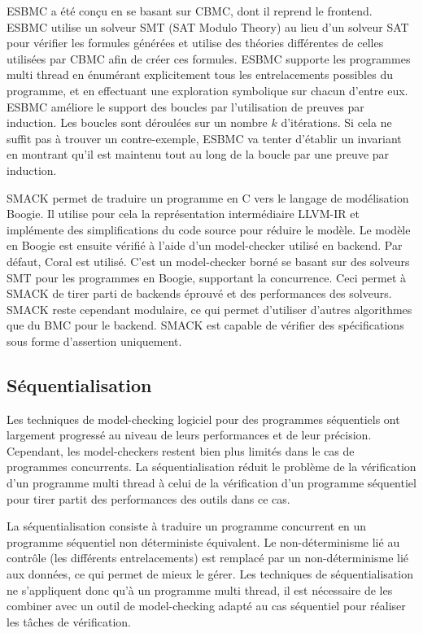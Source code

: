 ESBMC\cite{ESBMC} a été conçu en se basant sur CBMC, dont il reprend le
frontend. ESBMC utilise un solveur SMT (SAT Modulo Theory) au lieu d'un solveur
SAT pour vérifier les formules générées et utilise des théories différentes de
celles utilisées par CBMC afin de créer ces formules. ESBMC supporte les
programmes multi thread en énumérant explicitement tous les entrelacements
possibles du programme, et en effectuant une exploration symbolique sur chacun
d'entre eux. ESBMC améliore le support des boucles par l'utilisation de preuves
par induction\cite{ESBMC_k_induction}. Les boucles sont déroulées sur un nombre
\(k\) d'itérations. Si cela ne suffit pas à trouver un contre-exemple, ESBMC va
tenter d'établir un invariant en montrant qu'il est maintenu tout au long de la
boucle par une preuve par induction.

SMACK\cite{SMACK} permet de traduire un programme en C vers le langage de
modélisation Boogie. Il utilise pour cela la représentation
intermédiaire LLVM-IR et implémente des simplifications du code source pour
réduire le modèle. Le modèle en Boogie est ensuite vérifié à l'aide d'un
model-checker utilisé en backend. Par défaut, Coral est utilisé. C'est un
model-checker borné se basant sur des solveurs SMT pour les programmes en
Boogie, supportant la concurrence. Ceci permet à SMACK de tirer parti de
backends éprouvé et des performances des solveurs. SMACK reste cependant
modulaire, ce qui permet d'utiliser d'autres algorithmes que du BMC pour le
backend. SMACK est capable de vérifier des spécifications sous forme d'assertion
uniquement.

\subsection{Séquentialisation}

Les techniques de model-checking logiciel pour des programmes séquentiels ont
largement progressé au niveau de leurs performances et de leur précision.
Cependant, les model-checkers restent bien plus limités dans le cas de
programmes concurrents. La séquentialisation réduit le problème de la
vérification d'un programme multi thread à celui de la vérification d'un
programme séquentiel pour tirer partit des performances des outils dans ce cas.

La séquentialisation consiste à traduire un programme concurrent en un programme
séquentiel non déterministe équivalent. Le non-déterminisme lié au contrôle (les
différents entrelacements) est remplacé par un non-déterminisme lié aux données,
ce qui permet de mieux le gérer. Les techniques de séquentialisation ne
s'appliquent donc qu'à un programme multi thread, il est nécessaire de les
combiner avec un outil de model-checking adapté au cas séquentiel pour réaliser
les tâches de vérification.


